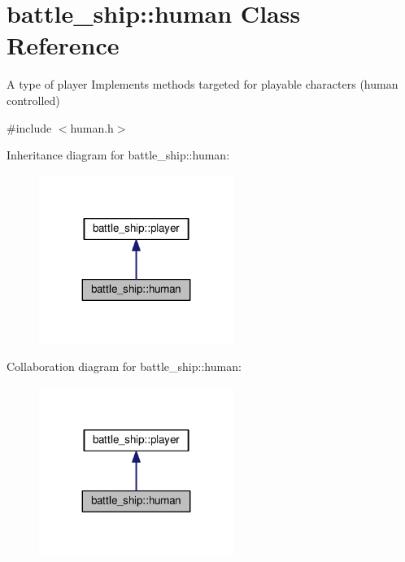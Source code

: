 \hypertarget{classbattle__ship_1_1human}{}\section{battle\+\_\+ship\+:\+:human Class Reference}
\label{classbattle__ship_1_1human}


A type of player Implements methods targeted for playable characters (human controlled)  




{\ttfamily \#include $<$human.\+h$>$}



Inheritance diagram for battle\+\_\+ship\+:\+:human\+:
\nopagebreak
\begin{figure}[H]
\begin{center}
\leavevmode
\includegraphics[width=179pt]{classbattle__ship_1_1human__inherit__graph}
\end{center}
\end{figure}


Collaboration diagram for battle\+\_\+ship\+:\+:human\+:
\nopagebreak
\begin{figure}[H]
\begin{center}
\leavevmode
\includegraphics[width=179pt]{classbattle__ship_1_1human__coll__graph}
\end{center}
\end{figure}
